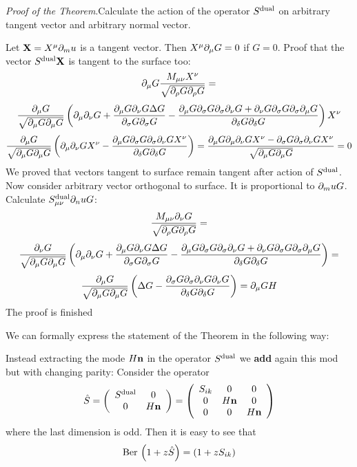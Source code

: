 \documentclass[12pt]{article}
\theoremstyle{theorem}
\begin{document}
\bigskip
{\it Proof of the Theorem}.Calculate the action of the operator $S^{\rm dual}$
on arbitrary tangent vector and arbitrary normal vector.

Let ${{\bf X}}=X^\mu\partial_mu$ is a tangent vector. Then  $X^\mu\partial_\mu G=0$ if $G=0$.
Proof that the vector $S^{\rm dual}{\bf X}$ is tangent to the surface too:
                 $$
\partial_\mu G{M_{\mu\nu}X^\nu\over \sqrt {\partial_\rho G \partial_\rho G}}=
                 $$
                  $$
                  {\partial_\mu G\over \sqrt {\partial_\mu G\partial_\mu G}} \left(
   \partial_\mu\partial_\nu G+{\partial_\mu G\partial_\nu G\Delta G\over \partial_{\sigma} G\partial_{\sigma} G}
  -{\partial_\mu G\partial_{\sigma} G\partial_{\sigma}\partial_\nu G+\partial_\nu G\partial_{\sigma} G\partial_{\sigma}\partial_\mu G
  \over \partial_\delta G\partial_\delta G}\right)X^\nu
                  $$
                      $$
            {\partial_\mu G\over \sqrt {\partial_\mu G\partial_\mu G}} \left(
   \partial_\mu\partial_\nu G X^\nu
  -{\partial_\mu G\partial_{\sigma} G\partial_{\sigma}\partial_\nu GX^\nu
  \over \partial_\delta G\partial_\delta G}\right)=
  {\partial_\mu G \partial_\mu\partial_\nu G X^\nu-\partial_{\sigma} G\partial_{\sigma}\partial_\nu GX^\nu
  \over \sqrt {\partial_\mu G\partial_\mu G}}
  =0$$
We proved that vectors tangent to surface remain tangent after action of
$S^{\rm dual}$. Now consider arbitrary vector orthogonal to surface. It
is proportional to $\partial_mu G$. Calculate $S^{\rm dual}_{\mu\nu}\partial_nu G$:
                $$
{M_{\mu\nu}{\partial_\nu G}\over \sqrt {\partial_\rho G \partial_\rho G}}=
                 $$
                  $$
                  {\partial_\nu G\over \sqrt {\partial_\mu G\partial_\mu G}} \left(
   \partial_\mu\partial_\nu G+{\partial_\mu G\partial_\nu G\Delta G\over \partial_{\sigma} G\partial_{\sigma} G}
  -{\partial_\mu G\partial_{\sigma} G\partial_{\sigma}\partial_\nu G+\partial_\nu G\partial_{\sigma} G\partial_{\sigma}\partial_\mu G
  \over \partial_\delta G\partial_\delta G}\right)=
                $$
              $$
  {\partial_\mu G\over \sqrt {\partial_\mu G\partial_\mu G}} \left(
             \Delta G-
   {\partial_{\sigma} G\partial_{\sigma}\partial_\nu G\partial_\nu G
  \over \partial_\delta G\partial_\delta G}\right)=\partial_\mu G H
              $$
              The proof is finished\finish


              \bigskip


 We can formally express the statement of the Theorem  in the following way:

Instead extracting the mode $H{\bf n}$ in the operator $S^{\rm dual}$
we {\bf add} again this mod but with changing parity: Consider the operator
\begin{equation}\label{operarotinextendedspace}
    \hat S=
\left(
\begin{array}{ccc}
  S^{\rm dual} & 0  \\
  0& H{\bf n}\\
\end{array}
\right)
=
\left(
\begin{array}{ccc}
  S_{ik} & 0 & 0 \\
  0& H{\bf n}& 0 \\
  0 & 0 &  H{\bf n} \\
\end{array}
\right)
\end{equation}
where the last dimension is odd. Then it is easy to see that
\begin{equation}\label{hostrelations}
    {\rm Ber\,}\left(1+z\hat S\right)=\left(1+zS_{ik}\right)
\end{equation}
\end{document}
